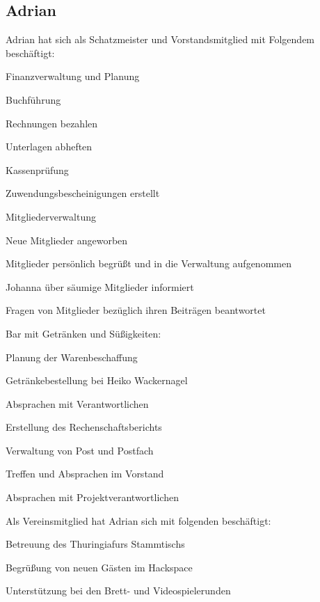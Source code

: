 \documentclass[ngerman]{scrartcl}
\begin{document}
\subsection{Adrian}
Adrian hat sich als Schatzmeister und Vorstandsmitglied mit Folgendem beschäftigt:
\begin{compactitem}
	\item Finanzverwaltung und Planung
	\begin{compactitem}
		\item Buchführung
		\item Rechnungen bezahlen
		\item Unterlagen abheften
		\item Kassenprüfung
		\item Zuwendungsbescheinigungen erstellt
	\end{compactitem}
	\item Mitgliederverwaltung
	\begin{compactitem}
		\item Neue Mitglieder angeworben
		\item Mitglieder persönlich begrüßt und in die Verwaltung aufgenommen
		\item Johanna über säumige Mitglieder informiert
		\item Fragen von Mitglieder bezüglich ihren Beiträgen beantwortet
	\end{compactitem}
	\item Bar mit Getränken und Süßigkeiten:
	\begin{compactitem}
		\item Planung der Warenbeschaffung
		\item Getränkebestellung bei Heiko Wackernagel
		\item Absprachen mit Verantwortlichen
	\end{compactitem}
	\item Erstellung des Rechenschaftsberichts
	\item Verwaltung von Post und Postfach
	\item Treffen und Absprachen im Vorstand
	\item Absprachen mit Projektverantwortlichen
\end{compactitem}

Als Vereinsmitglied hat Adrian sich mit folgenden beschäftigt: 
\begin{compactitem}
	\item Betreuung des Thuringiafurs Stammtischs
	\item Begrüßung von neuen Gästen im Hackspace
	\item Unterstützung bei den Brett- und Videospielerunden
\end{compactitem}
\end{document}
